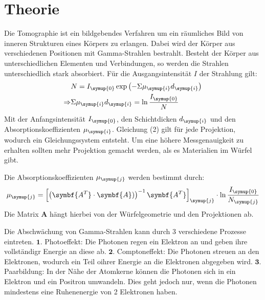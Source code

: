 \section{Theorie}
\label{sec:Theorie}

Die Tomographie ist ein bildgebendes Verfahren um ein räumliches Bild von inneren Strukturen
eines Körpers zu erlangen. Dabei wird der Körper aus verschiedenen Positionen mit
Gamma-Strahlen bestrahlt. Besteht der Körper aus unterschiedlichen Elementen und Verbindungen,
so werden die Strahlen unterschiedlich stark absorbiert. Für die Ausgangsintensität $I$
der Strahlung gilt:
\begin{align}
  &N=I_{\symup{0}} \exp{\left(-\Sigma \mu_{\symup{i}} d_{\symup{i}}\right)} \\
  \Rightarrow &\Sigma \mu_{\symup{i}} d_{\symup{i}} = \ln{\frac{I_{\symup{0}}}{N}}
  \label{eqn:mu}
\end{align}
Mit der Anfangsintensität $I_{\symup{0}}$, den Schichtdicken $d_{\symup{i}}$
und den Absorptionskoeffizienten $\mu_{\symup{i}}$.
Gleichung (2) gilt für jede Projektion, wodurch ein Gleichungssystem entsteht. Um eine höhere
Messgenauigkeit zu erhalten sollten mehr Projektion gemacht werden, als es
Materialien im Würfel gibt.

Die Absorptionskoeffizienten $\mu_{\symup{j}}$ werden bestimmt durch:
\begin{align}
  \mu_{\symup{j}} = \left[\left(\symbf{A^T} \cdot \symbf{A})\right)^{-1} \symbf{A^T}\right]_{\symup{j}} \cdot \ln{\frac{I_{\symup{0}}}{N_{\symup{j}}}}
\end{align}
Die Matrix $\symbf{A}$ hängt hierbei von der Würfelgeometrie und den Projektionen ab.

Die Abschwächung von Gamma-Strahlen kann durch 3 verschiedene Prozesse eintreten.
$\symbf{1.}$ Photoeffekt: Die Photonen regen ein Elektron an und geben ihre vollständigr Energie an diese ab.
$\symbf{2.}$ Comptoneffekt: Die Photonen streuen an den Elektronen, wodurch ein Teil oihrer Energie
an die Elektronen abgegeben wird.
$\symbf{3.}$ Paarbildung: In der Nähe der Atomkerne können die Photonen sich in ein Elektron und ein Positron
umwandeln. Dies geht jedoch nur, wenn die Photonen mindestens eine Ruhenenergie von 2 Elektronen
haben.
